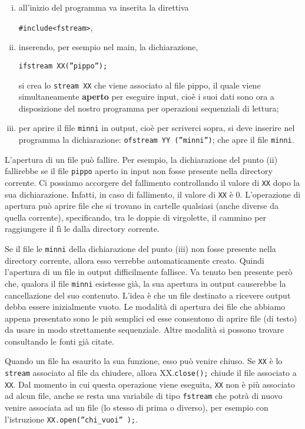\documentclass[a4paper,12pt]{book}
\begin{document}
\begin{enumerate}[i)]
\item all'inizio del programma va inserita la direttiva

\texttt{\#include<fstream>},

\item inserendo, per esempio nel main, la dichiarazione,

\texttt{ifstream XX(''pippo'');}
			
\noindent si crea lo \texttt{stream XX} che viene associato al file pippo, il quale vie­ne simultaneamente \textbf{aperto} per eseguire input, cioè i suoi dati sono ora a disposizione del nostro programma per operazioni sequenziali di lettura;

\item per aprire il file \texttt{minni} in output, cioè per scriverci sopra, si deve inserire nel programma la dichiarazione: \texttt{ofstream YY (''minni'')}; che apre il file \texttt{minni}.
\end{enumerate}

L'apertura di un file può fallire.
Per esempio, la dichiarazione del punto (ii) fallirebbe se il file \texttt{pippo} aperto in input non fosse presente nella directory corrente.
Ci possiamo accorgere del fallimento controllando il valore di \texttt{XX} dopo la sua dichiarazione.
Infatti, in caso di fallimento, il valore di \texttt{XX} è 0.
L'operazione di apertura può aprire file che si trovano in cartelle qualsiasi (anche diverse da quella corrente), specificando, tra le doppie di virgolette, il cammino per raggiungere il fì le dalla directory corrente. 

Se il file le \texttt{minni} della dichiarazione del punto (iii) non fosse presente nella directory corrente, allora esso verrebbe automaticamente creato. Quindi l'apertura di un file in output difficilmente fallisce.
Va tenuto ben presente però che, qualora il file \texttt{minni} esistesse già, la sua apertura in output causerebbe la cancellazione del suo contenuto.
L'idea è che un file destinato a ricevere output debba essere inizialmente vuoto. Le modalità di apertura dei file che abbiamo appena presentato sono le più semplici ed esse consentono di aprire file (di testo) da usare in modo strettamente sequenziale.
Altre modalità si possono trovare consultando le fonti già citate. 

Quando un file ha esaurito la sua funzione, esso può venire chiuso. Se \texttt{XX} è lo \texttt{stream} associato al file da chiudere, allora XX.\texttt{close();} chiude il file associato a \texttt{XX}. Dal momento in cui questa operazione viene eseguita, \texttt{XX} non è più associato ad alcun file, anche se resta una variabile di tipo \texttt{fstream} che potrà di nuovo venire associata ad un file (lo stesso di prima o diverso), per esempio con l'istruzione \texttt{XX.open(''chi\_vuoi'' );}. 
\end{document}
